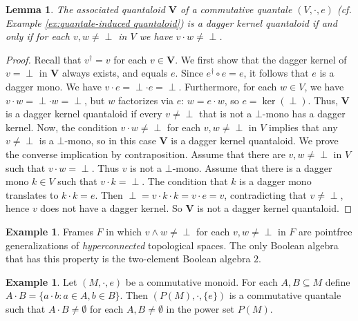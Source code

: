 \documentclass[12pt]{tac}
\newtheorem{lemma}[theorem]{Lemma}
\theoremstyle{definition}
\newtheorem{example}[theorem]{Example}
\theoremstyle{remark}
\newcommand{\<}{\langle}
\renewcommand{\>}{\rangle}
\renewcommand{\:}{\colon}
\begin{document}
\begin{lemma}\label{lem:dagger-kernel-quantale}
   The associated quantaloid $\mathbf V$ of a commutative quantale $(V,\cdot,e)$ (cf. Example \ref{ex:quantale-induced quantaloid}) is a dagger kernel quantaloid if and only if for each $v,w\neq\perp$ in $V$ we have $v\cdot w\neq\perp$.  
\end{lemma}
\begin{proof}
Recall that $v^\dag=v$ for each $v\in\mathbf V$. We first show that the dagger kernel of $v=\perp$ in $\mathbf V$ always exists, and equals $e$. Since $e^\dag\circ e=e$, it follows that $e$ is a dagger mono. We have $v\cdot e=\perp\cdot e=\perp$. Furthermore, for each $w\in V$, we have $v\cdot w=\perp\cdot w=\perp$, but $w$ factorizes via $e$: $w=e\cdot w$, so $e=\ker(\perp)$. Thus, $\mathbf V$ is a dagger kernel quantaloid if every $v\neq\perp$ that is not a $\bot$-mono has a dagger kernel. Now, the condition $v\cdot w\neq\perp$ for each $v,w\neq\perp$ in $V$ implies that any $v\neq\perp$ is a $\bot$-mono, so in this case $\mathbf V$ is a dagger kernel quantaloid. We prove the converse implication by contraposition. Assume that there are $v,w\neq \perp$ in $V$ such that $v\cdot w=\perp$. Thus $v$ is not a $\bot$-mono. Assume that there is a dagger mono $k\in V$ such that $v\cdot k=\perp$. The condition that $k$ is a dagger mono translates to $k\cdot k=e$. Then $\perp=v\cdot k\cdot k=v\cdot e=v$, contradicting that $v\neq \perp$, hence $v$ does not have a dagger kernel. So $\mathbf V$ is not a dagger kernel quantaloid.
\end{proof}


\begin{example}
Frames $F$ in which $v\wedge w\neq \perp$ for each $v,w\neq \perp$ in $F$ are pointfree generalizations of \emph{hyperconnected} topological spaces. The only Boolean algebra that has this property is the two-element Boolean algebra $2$.
\end{example}

\begin{example}
    Let $(M,\cdot,e)$ be a commutative monoid. For each $A,B\subseteq M$ define $A\cdot B=\{a\cdot b:a\in A,b\in B\}$. Then $(P(M),\cdot ,\{e\})$ is a commutative quantale such that $A\cdot B\neq \emptyset$ for each $A,B\neq\emptyset$ in the power set $P(M)$. 
\end{example}
\end{document}
